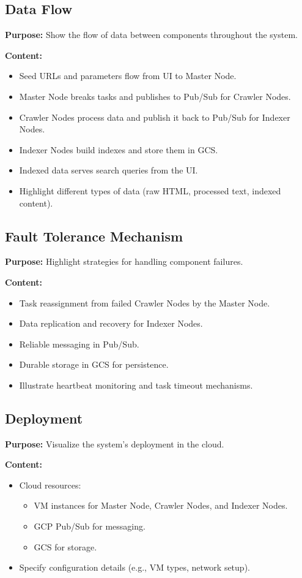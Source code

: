 \documentclass[12pt,a4paper]{report}
\begin{document}
\subsection{Data Flow}
\textbf{Purpose:} Show the flow of data between components throughout the system.

\textbf{Content:}
\begin{itemize}
\item Seed URLs and parameters flow from UI to Master Node.
\item Master Node breaks tasks and publishes to Pub/Sub for Crawler Nodes.
\item Crawler Nodes process data and publish it back to Pub/Sub for Indexer Nodes.
\item Indexer Nodes build indexes and store them in GCS.
\item Indexed data serves search queries from the UI.
\item Highlight different types of data (raw HTML, processed text, indexed content).
\end{itemize}

\subsection{Fault Tolerance Mechanism}
\textbf{Purpose:} Highlight strategies for handling component failures.

\textbf{Content:}
\begin{itemize}
\item Task reassignment from failed Crawler Nodes by the Master Node.
\item Data replication and recovery for Indexer Nodes.
\item Reliable messaging in Pub/Sub.
\item Durable storage in GCS for persistence.
\item Illustrate heartbeat monitoring and task timeout mechanisms.
\end{itemize}

\subsection{Deployment}
\textbf{Purpose:} Visualize the system's deployment in the cloud.

\textbf{Content:}
\begin{itemize}
\item Cloud resources:
\begin{itemize}
    \item VM instances for Master Node, Crawler Nodes, and Indexer Nodes.
    \item GCP Pub/Sub for messaging.
    \item GCS for storage.
\end{itemize}
\item Specify configuration details (e.g., VM types, network setup).
\end{itemize}
\end{document}
